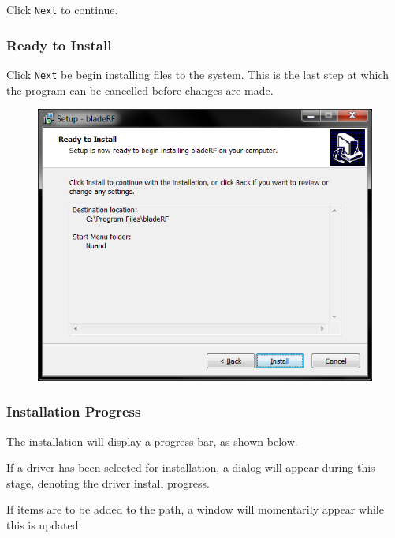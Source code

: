 {Click \texttt{Next} to continue.

\newpage
\subsubsection{Ready to Install}

Click \texttt{Next} be begin installing files to the system. This
is the last step at which the program can be cancelled before
changes are made.

\begin{figure}[h]
  \centering
  \includegraphics{images/windows/installer/07-ready.png}
\end{figure}


\newpage
\subsubsection{Installation Progress}

The installation will display a progress bar, as shown below.

If a driver has been selected for installation, a dialog will appear
during this stage, denoting the driver install progress.

If items are to be added to the \matlab path, a \matlab window
will momentarily appear while this is updated.

}
